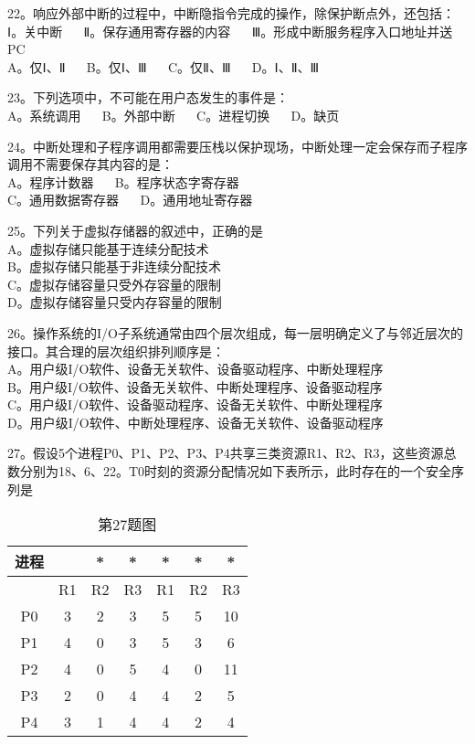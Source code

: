 22。响应外部中断的过程中，中断隐指令完成的操作，除保护断点外，还包括：\\
Ⅰ。关中断 $\quad$ Ⅱ。保存通用寄存器的内容 $\quad$ Ⅲ。形成中断服务程序入口地址并送PC\\
A。仅Ⅰ、Ⅱ $\quad$ B。仅Ⅰ、Ⅲ $\quad$ C。仅Ⅱ、Ⅲ $\quad$ D。Ⅰ、Ⅱ、Ⅲ

23。下列选项中，不可能在用户态发生的事件是：\\
A。系统调用 $\quad$ B。外部中断 $\quad$ C。进程切换 $\quad$ D。缺页

24。中断处理和子程序调用都需要压栈以保护现场，中断处理一定会保存而子程序调用不需要保存其内容的是：\\
A。程序计数器 $\quad$ B。程序状态字寄存器\\
C。通用数据寄存器 $\quad$ D。通用地址寄存器

25。下列关于虚拟存储器的叙述中，正确的是\\
A。虚拟存储只能基于连续分配技术\\
B。虚拟存储只能基于非连续分配技术\\
C。虚拟存储容量只受外存容量的限制\\
D。虚拟存储容量只受内存容量的限制

26。操作系统的I/O子系统通常由四个层次组成，每一层明确定义了与邻近层次的接口。其合理的层次组织排列顺序是：\\
A。用户级I/O软件、设备无关软件、设备驱动程序、中断处理程序\\
B。用户级I/O软件、设备无关软件、中断处理程序、设备驱动程序\\
C。用户级I/O软件、设备驱动程序、设备无关软件、中断处理程序\\
D。用户级I/O软件、中断处理程序、设备无关软件、设备驱动程序

27。假设5个进程P0、P1、P2、P3、P4共享三类资源R1、R2、R3，这些资源总数分别为18、6、22。T0时刻的资源分配情况如下表所示，此时存在的一个安全序列是\\
\begin{table}[ht]
\centering
\caption{第27题图}\label{tab_CSN12_1}
\begin{tabular}{|c|c|c|c|c|c|c|}
\hline
 进程 & & * & * & * & * & * \\
\hline
 & R1 & R2 & R3 & R1 & R2 & R3 \\
\hline
P0 & 3 & 2 & 3 & 5 & 5 & 10 \\
\hline
P1 & 4 & 0 & 3 & 5 & 3 & 6 \\
\hline
P2 & 4 & 0 & 5 & 4 & 0 & 11 \\
\hline
P3 & 2 & 0 & 4 & 4 & 2 & 5 \\
\hline
P4 & 3 & 1 & 4 & 4 & 2 & 4 \\
\hline
\end{tabular}
\end{table} \\


